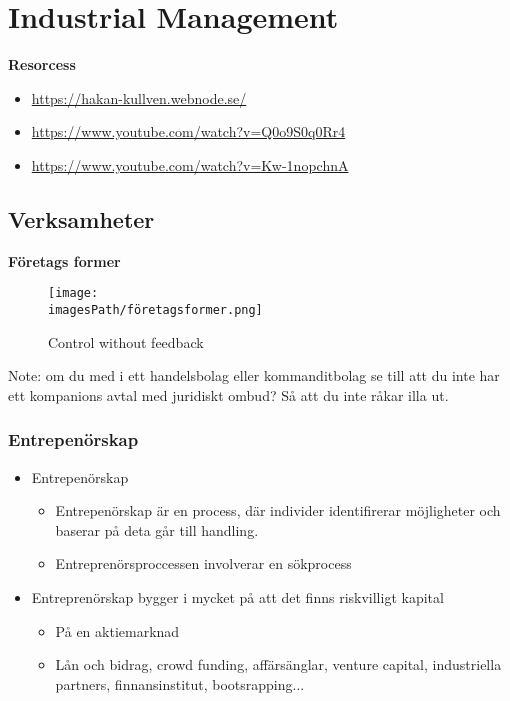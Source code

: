\chapter{Industrial Management}

\textbf{Resorcess}
\begin{itemize}
    \item \url{https://hakan-kullven.webnode.se/}
    \item \url{https://www.youtube.com/watch?v=Q0o9S0q0Rr4}
    \item \url{https://www.youtube.com/watch?v=Kw-1nopchnA}
\end{itemize}

\newpage

\section{Verksamheter}
\textbf{Företags former}
\begin{figure}[!h]
    \centering
    \texttt{[image: \\imagesPath/företagsformer.png]}
    \caption{Control without feedback}
\end{figure}


Note: om du med i ett handelsbolag eller kommanditbolag se till att du inte
har ett kompanions avtal med juridiskt ombud? Så att du inte råkar illa ut.

\subsection{Entrepenörskap}
\begin{itemize}
    \item Entrepenörskap
    \begin{itemize}
        \item Entrepenörskap är en process, där individer identifirerar möjligheter och baserar på deta går till handling.
        \item Entreprenörsproccessen involverar en sökprocess
    \end{itemize}
    \item Entreprenörskap bygger i mycket på att det finns riskvilligt kapital
    \begin{itemize}
        \item På en aktiemarknad 
        \item Lån och bidrag, crowd funding, affärsänglar, venture capital, industriella partners, finnansinstitut, bootsrapping...
    \end{itemize}
\end{itemize}


